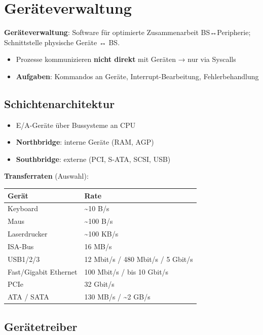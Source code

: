 \documentclass[11pt, a4paper]{article}
\begin{document}
\section{Geräteverwaltung}

\textbf{Geräteverwaltung}: Software für optimierte Zusammenarbeit BS↔Peripherie; Schnittstelle physische Geräte ↔ BS.

\begin{itemize}
  \item Prozesse kommunizieren \textbf{nicht direkt} mit Geräten → nur via Syscalls
  \item \textbf{Aufgaben}: Kommandos an Geräte, Interrupt-Bearbeitung, Fehlerbehandlung
\end{itemize}


\subsection{Schichtenarchitektur}
\begin{itemize}
  \item E/A-Geräte über Bussysteme an CPU
  \item \textbf{Northbridge}: interne Geräte (RAM, AGP)
  \item \textbf{Southbridge}: externe (PCI, S-ATA, SCSI, USB)
\end{itemize}

\textbf{Transferraten} (Auswahl):


{\small
\begin{tabularx}{\linewidth}{XX}
\hline
\rowcolor{tableheadbg}
{\color{white}\textbf{Gerät}} & {\color{white}\textbf{Rate}} \\[2pt]
\hline
\endhead
\hline
\endfoot
Keyboard & \textasciitilde{}10 B/s \\
Maus & \textasciitilde{}100 B/s \\
Laserdrucker & \textasciitilde{}100 KB/s \\
ISA-Bus & 16 MB/s \\
USB1/2/3 & 12 Mbit/s / 480 Mbit/s / 5 Gbit/s \\
Fast/Gigabit Ethernet & 100 Mbit/s / bis 10 Gbit/s \\
PCIe & 32 Gbit/s \\
ATA / SATA & 130 MB/s / \textasciitilde{}2 GB/s \\
\end{tabularx}
}



\subsection{Gerätetreiber}
\end{document}
